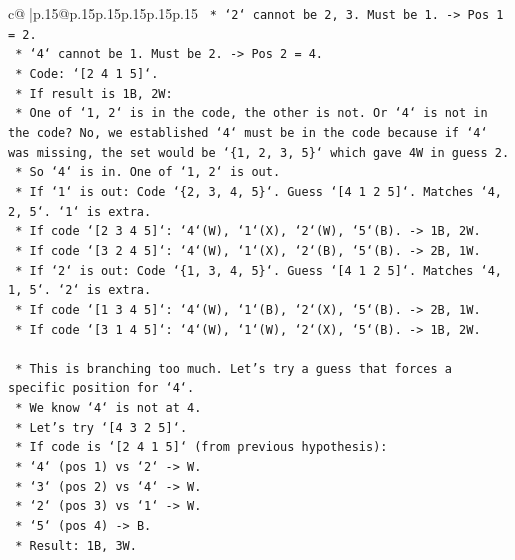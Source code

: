 \documentclass{article}
\begin{document}
{\begin{supertabular}{c@{$\;$}|p{.15\linewidth}@{}p{.15\linewidth}p{.15\linewidth}p{.15\linewidth}p{.15\linewidth}p{.15\linewidth}}
{{{\texttt{                *   `2` cannot be 2, 3. Must be 1. {-}> Pos 1 = 2.} \\
\texttt{                *   `4` cannot be 1. Must be 2. {-}> Pos 2 = 4.} \\
\texttt{                *   Code: `{[}2 4 1 5{]}`.} \\
\texttt{        *   If result is 1B, 2W:} \\
\texttt{            *   One of `1, 2` is in the code, the other is not. Or `4` is not in the code? No, we established `4` must be in the code because if `4` was missing, the set would be `\{1, 2, 3, 5\}` which gave 4W in guess 2.} \\
\texttt{            *   So `4` is in. One of `1, 2` is out.} \\
\texttt{            *   If `1` is out: Code `\{2, 3, 4, 5\}`. Guess `{[}4 1 2 5{]}`. Matches `4, 2, 5`. `1` is extra.} \\
\texttt{                *   If code `{[}2 3 4 5{]}`: `4`(W), `1`(X), `2`(W), `5`(B). {-}> 1B, 2W.} \\
\texttt{                *   If code `{[}3 2 4 5{]}`: `4`(W), `1`(X), `2`(B), `5`(B). {-}> 2B, 1W.} \\
\texttt{            *   If `2` is out: Code `\{1, 3, 4, 5\}`. Guess `{[}4 1 2 5{]}`. Matches `4, 1, 5`. `2` is extra.} \\
\texttt{                *   If code `{[}1 3 4 5{]}`: `4`(W), `1`(B), `2`(X), `5`(B). {-}> 2B, 1W.} \\
\texttt{                *   If code `{[}3 1 4 5{]}`: `4`(W), `1`(W), `2`(X), `5`(B). {-}> 1B, 2W.} \\
\\ 
\texttt{    *   This is branching too much. Let's try a guess that forces a specific position for `4`.} \\
\texttt{    *   We know `4` is not at 4.} \\
\texttt{    *   Let's try `{[}4 3 2 5{]}`.} \\
\texttt{        *   If code is `{[}2 4 1 5{]}` (from previous hypothesis):} \\
\texttt{            *   `4` (pos 1) vs `2` {-}> W.} \\
\texttt{            *   `3` (pos 2) vs `4` {-}> W.} \\
\texttt{            *   `2` (pos 3) vs `1` {-}> W.} \\
\texttt{            *   `5` (pos 4) {-}> B.} \\
\texttt{            *   Result: 1B, 3W.} \\
}}}
\end{supertabular}}
\end{document}
